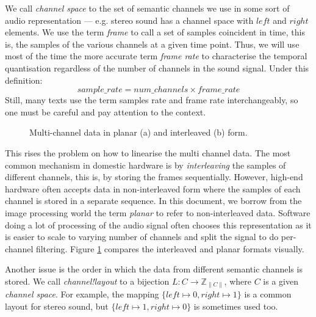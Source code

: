 We call \emph{channel space} to the set of
semantic channels we use in some sort of audio representation ---
e.g. stereo sound has a channel space with $left$ and $right$
elements. We use the term \emph{frame} to call a
set of samples coincident in time, this is, the samples of the various
channels at a given time point. Thus, we will use most of the time the
more accurate term \emph{frame rate} to characterise
the temporal quantisation regardless of the number of channels in the
sound signal. Under this definition:
\begin{equation}
sample\_rate = num\_channels \times frame\_rate
\end{equation}
Still, many texts use the term samples rate and frame rate
interchangeably, so one must be careful and pay attention to the
context.

\begin{figure}[h]
  \centering
  \;
  \caption{Multi-channel data in planar (a) and interleaved (b) form.}
  \label{fig:interleaving}
\end{figure}

This rises the problem on how to linearise the multi channel data. The
most common mechanism in domestic hardware is by
\emph{interleaving} the samples of different
channels, this is, by storing the frames sequentially. However,
high-end hardware often accepts data in non-interleaved form where the
samples of each channel is stored in a separate sequence. In this
document, we borrow from the image processing world the term
\emph{planar} to refer to
non-interleaved data. Software doing a lot of processing of the audio
signal often chooses this representation as it is easier to scale to
varying number of channels and split the signal to do per-channel
filtering. Figure \ref{fig:interleaving} compares the
interleaved and planar formats visually.

Another issue is the order in which the data from different semantic
channels is stored. We call \emph{channel!layout} to a bijection $L : C \rightarrow
\mathbb{Z}_{\|C\|}$, where $C$ is a given \emph{channel space}. For
example, the mapping $\{ left \mapsto 0, right \mapsto 1 \}$ is a
common layout for stereo sound, but $\{ left \mapsto 1, right \mapsto
0 \}$ is sometimes used too.

